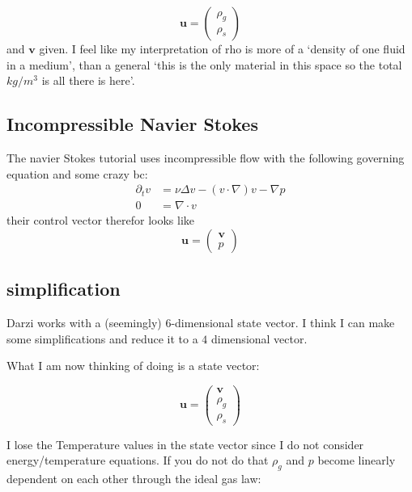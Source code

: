 \documentclass{article}
\begin{document}
\begin{equation}
    \mathbf{u} = \begin{pmatrix}
        \rho_g \\ \rho_s
    \end{pmatrix}
\end{equation}
and $\mathbf{v}$ given. I feel like my interpretation of rho is more of a `density of one fluid in a medium', than a general `this is the only material in this space so the total $kg/m^3$ is all there is here'.

\subsection*{Incompressible Navier Stokes}
The navier Stokes tutorial uses incompressible flow with the following governing equation and some crazy bc:
\begin{align}
    \partial_t v &= \nu \Delta v - (v\cdot \nabla) v -\nabla p \\
            0    &= \nabla \cdot v
\end{align}
their control vector therefor looks like
\begin{equation}
    \mathbf{u} = \begin{pmatrix}
        \mathbf{v} \\ p
    \end{pmatrix}
\end{equation}

\subsection*{simplification}
Darzi works with a (seemingly) 6-dimensional state vector. I think I can make some simplifications and reduce it to a $4$ dimensional vector. 

What I am now thinking of doing is a state vector:

\begin{equation}
    \mathbf{u} = \begin{pmatrix}
        \mathbf{v} \\ \rho_g \\ \rho_s
    \end{pmatrix}
\end{equation}

I lose the Temperature values in the state vector since I do not consider energy/temperature equations. If you do not do that $\rho_g$ and $p$ become linearly dependent on each other through the ideal gas law:
\end{document}
